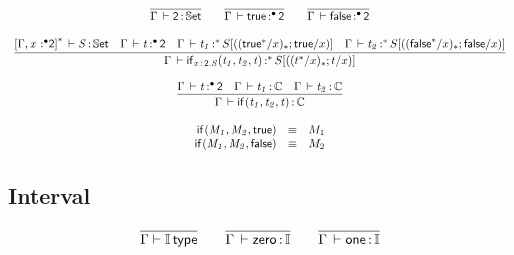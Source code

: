 \documentclass[11pt]{article}
\theoremstyle{plain}
\begin{document}
\[
\begin{array}{c}
\infer{\ofdtp{\Gamma}{\bool}{\types}}
      {}
\qquad
\infer{\oftpe{\Gamma}{\dsd{true}}{\bullet}{\bool}}{}
\qquad
\infer{\oftpe{\Gamma}{\dsd{false}}{\bullet}{\bool}}{}
\\ \\
\infer{\oftpe{\Gamma}{\ite{\tptm{x}{\dsd{2}}.S}{t_1}{t_2}{t}}{\vcond}{\tsubst{S}{\substdup{(t^\vcond/x)}{\vcond}{t/x}}}}
      {\ofdtp{\dupctx{\Gamma,\tptmv{x}{\bullet}{\dsd{2}}}{\vcond}}{S}{\types} &
        \oftpe{\Gamma}{t}{\bullet}{\dsd{2}} &
        \oftpe{\Gamma}{t_1}{\vcond}{\tsubst{S}{\substdup{(\dsd{true}^\vcond/x)}{\vcond}{\dsd{true}/x}}} &
        \oftpe{\Gamma}{t_2}{\vcond}{\tsubst{S}{\substdup{(\dsd{false}^\vcond/x)}{\vcond}{\dsd{false}/x}}}
      }
\\ \\
\infer{\oftp{\Gamma}{\ite{}{t_1}{t_2}{t}}{\C}}
      { \oftpe{\Gamma}{t}{\bullet}{\dsd{2}} &
        \ofdtp{\Gamma}{t_1}{\C} &
        \ofdtp{\Gamma}{t_2}{\C}
      }
\\ \\
\begin{array}{rcll}
\ite{}{M_1}{M_2}{\dsd{true}} & \equiv & M_1 \\
\ite{}{M_1}{M_2}{\dsd{false}} & \equiv & M_2 \\
\end{array} \\
\end{array}
\]

\subsection{Interval}

\[
\begin{array}{c}
\infer{\wftp{\Gamma}{\I}}
      {}
\qquad
\infer{\oftp{\Gamma}{\Iz}{\I}}{}
\qquad
\infer{\oftp{\Gamma}{\Io}{\I}}{}
\end{array}
\]
\end{document}
